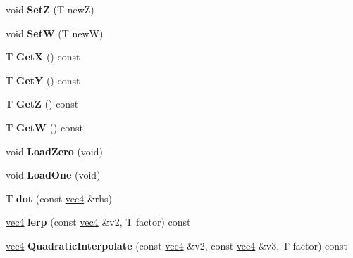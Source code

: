 \begin{DoxyCompactItemize}
\item 
\hypertarget{classmath_1_1vec4_ab6b16d41d26526c301c319ef3d724c94}{
void {\bfseries SetZ} (T newZ)}
\label{classmath_1_1vec4_ab6b16d41d26526c301c319ef3d724c94}

\item 
\hypertarget{classmath_1_1vec4_aab15f29bbc9e07e2a788c0fd2399c97f}{
void {\bfseries SetW} (T newW)}
\label{classmath_1_1vec4_aab15f29bbc9e07e2a788c0fd2399c97f}

\item 
\hypertarget{classmath_1_1vec4_a996db2662ab13120350ef3234618d921}{
T {\bfseries GetX} () const }
\label{classmath_1_1vec4_a996db2662ab13120350ef3234618d921}

\item 
\hypertarget{classmath_1_1vec4_ac06c44a0e840bde6171fb2f18461d5a2}{
T {\bfseries GetY} () const }
\label{classmath_1_1vec4_ac06c44a0e840bde6171fb2f18461d5a2}

\item 
\hypertarget{classmath_1_1vec4_af03172026b89f7b514d05eadd5d33360}{
T {\bfseries GetZ} () const }
\label{classmath_1_1vec4_af03172026b89f7b514d05eadd5d33360}

\item 
\hypertarget{classmath_1_1vec4_a37c74aff9f93d229c5218ad57b20bc69}{
T {\bfseries GetW} () const }
\label{classmath_1_1vec4_a37c74aff9f93d229c5218ad57b20bc69}

\item 
\hypertarget{classmath_1_1vec4_a89f5cbcdaebeba00e49ca3ad48b50e54}{
void {\bfseries LoadZero} (void)}
\label{classmath_1_1vec4_a89f5cbcdaebeba00e49ca3ad48b50e54}

\item 
\hypertarget{classmath_1_1vec4_af2ef943623b385a1f93d7369005c18b6}{
void {\bfseries LoadOne} (void)}
\label{classmath_1_1vec4_af2ef943623b385a1f93d7369005c18b6}

\item 
\hypertarget{classmath_1_1vec4_a3716bb581ac654c528edd07dd34f7ba3}{
T {\bfseries dot} (const \hyperlink{classmath_1_1vec4}{vec4} \&rhs)}
\label{classmath_1_1vec4_a3716bb581ac654c528edd07dd34f7ba3}

\item 
\hypertarget{classmath_1_1vec4_ae035ab0de6e786e8c30fb547eb222769}{
\hyperlink{classmath_1_1vec4}{vec4} {\bfseries lerp} (const \hyperlink{classmath_1_1vec4}{vec4} \&v2, T factor) const }
\label{classmath_1_1vec4_ae035ab0de6e786e8c30fb547eb222769}

\item 
\hypertarget{classmath_1_1vec4_af2da5bdd1816c17598525f9003bcb38a}{
\hyperlink{classmath_1_1vec4}{vec4} {\bfseries QuadraticInterpolate} (const \hyperlink{classmath_1_1vec4}{vec4} \&v2, const \hyperlink{classmath_1_1vec4}{vec4} \&v3, T factor) const }
\label{classmath_1_1vec4_af2da5bdd1816c17598525f9003bcb38a}


\end{DoxyCompactItemize}
